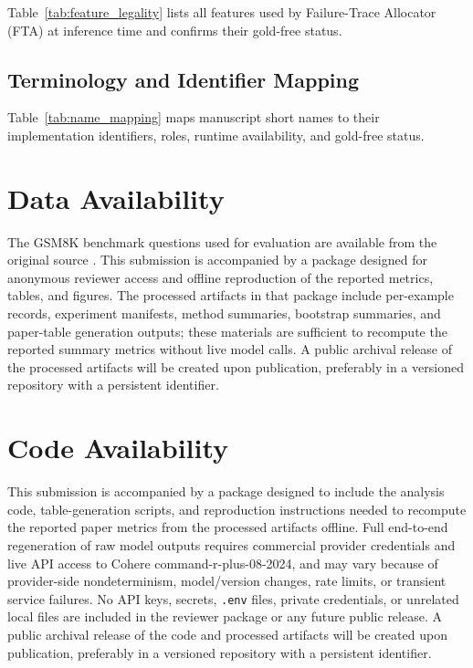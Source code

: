 Table~\ref{tab:feature_legality} lists all features used by Failure-Trace Allocator (FTA) at
inference time and confirms their gold-free status.



\clearpage
\subsection*{Terminology and Identifier Mapping}

Table~\ref{tab:name_mapping} maps manuscript short names to their
implementation identifiers, roles, runtime availability, and gold-free status.



\section*{Data Availability}
The GSM8K benchmark questions used for evaluation are available from the original source
\citep{cobbe2021training}. This submission is accompanied by a package designed for
anonymous reviewer access and offline reproduction of the reported metrics, tables,
and figures. The processed artifacts in that package include per-example records,
experiment manifests, method summaries, bootstrap summaries, and paper-table
generation outputs; these materials are sufficient to recompute the reported
summary metrics without live model calls. A public archival release of the processed
artifacts will be created upon publication, preferably in a versioned repository
with a persistent identifier.

\section*{Code Availability}
This submission is accompanied by a package designed to include the analysis code,
table-generation scripts, and reproduction instructions needed to recompute the
reported paper metrics from the processed artifacts offline. Full end-to-end
regeneration of raw model outputs requires commercial provider credentials and live
API access to Cohere command-r-plus-08-2024, and may vary because of provider-side
nondeterminism, model/version changes, rate limits, or transient service failures.
No API keys, secrets, \texttt{.env} files, private credentials, or unrelated local
files are included in the reviewer package or any future public release. A public
archival release of the code and processed artifacts will be created upon publication,
preferably in a versioned repository with a persistent identifier.

